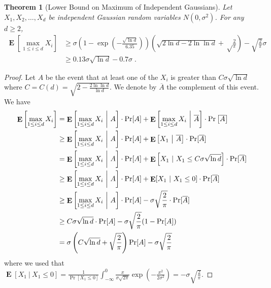 \documentclass{article}
\DeclareMathOperator*{\Exp}{\mathbf{E}}
\newtheorem{theorem}{Theorem}
\begin{document}
\begin{theorem}[Lower Bound on Maximum of Independent Gaussians]
\label{theorem:maximum-of-gaussians}
Let $X_1, X_2, \dots, X_d$ be independent Gaussian random variables $N(0,\sigma^2)$. For any $d \ge 2$,
\begin{align}
\Exp \left[\max_{1 \le i \le d} X_i\right]
& \ge \sigma \left(1 - \exp\left(-\frac{\sqrt{\ln d}}{6.35}\right)\right) \left(\sqrt{2 \ln d - 2 \ln \ln d} +\sqrt\frac{2}{\pi}\right) -\sqrt{\frac{2}{\pi}} \sigma \label{equation:maximum-of-gaussians-lower-bound-1} \\
& \ge 0.13 \sigma \sqrt{\ln d} - 0.7 \sigma \label{equation:maximum-of-gaussians-lower-bound-2} \; .
\end{align}
\end{theorem}

\begin{proof}
Let $A$ be the event that at least one of the $X_i$ is greater than $C \sigma
\sqrt{\ln d}$ where $C = C(d) = \sqrt{2 - \frac{2 \ln \ln d}{\ln d}}$. We
denote by $\overline{A}$ the complement of this event. We have
\begin{align}
\Exp \left[ \max_{1 \le i \le d} X_i \right]
& = \Exp \left[ \max_{1 \le i \le d} X_i ~ \middle|~ A \right] \cdot \Pr[A] + \Exp \left[ \max_{1 \le i \le d} X_i ~\middle|~ \overline{A} \right] \cdot \Pr \left[ \overline{A} \right] \notag \\
& \ge \Exp \left[ \max_{1 \le i \le d} X_i ~\middle|~ A \right] \cdot \Pr[A] + \Exp \left[ X_1 ~\middle|~ \overline{A} \right] \cdot \Pr[\overline{A}] \notag \\
& = \Exp \left[ \max_{1 \le i \le d} X_i~\middle|~ A \right] \cdot \Pr[A] + \Exp \left[ X_1~|~ X_1 \le C \sigma \sqrt{\ln d} \right] \cdot \Pr[\overline{A}] \notag \\
& \ge \Exp \left[ \max_{1 \le i \le d} X_i~\middle|~ A \right] \cdot \Pr[A] + \Exp[X_1~|~ X_1 \le 0] \cdot \Pr[\overline{A}] \notag \\
& \ge \Exp \left[ \max_{1 \le i \le d} X_i~\middle|~ A \right] \cdot \Pr[A] - \sigma \sqrt{\frac{2}{\pi}} \cdot \Pr[\overline{A}] \notag \\
& \ge C \sigma \sqrt{\ln d} \cdot \Pr[A] - \sigma \sqrt{\frac{2}{\pi}} (1 - \Pr[A]) \notag \\
& = \sigma \left(C\sqrt{\ln d} + \sqrt{\frac{2}{\pi}}\right) \Pr[A] -  \sigma \sqrt{\frac{2}{\pi}} \label{equation:maximum-of-gaussians-lower-bound-3}
\end{align}
where we used that $\Exp[X_1 ~|~ X_1 \le 0] = \frac{1}{\Pr[X_1 \le 0]} \int_{-\infty}^0 \frac{x}{\sigma \sqrt{2\pi}} \exp \left(- \frac{x^2}{2\sigma^2} \right) = - \sigma \sqrt{\frac{2}{\pi}}$.


\end{proof}
\end{document}
